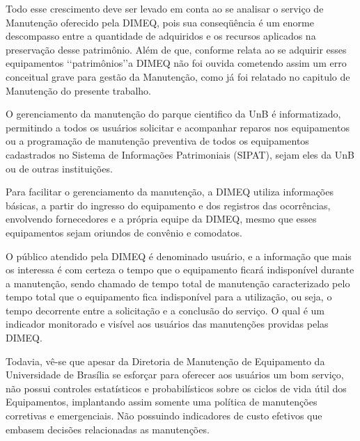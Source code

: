 Todo esse crescimento deve ser levado em conta ao se analisar o serviço de Manutenção oferecido pela DIMEQ, pois sua conseqüência é um enorme descompasso entre a quantidade de adquiridos e os recursos aplicados na preservação desse patrimônio. Além de que, conforme relata \cite{limacastilho2006} ao se adquirir esses equipamentos \lq\lq patrimônios\rq\rq a DIMEQ não foi ouvida cometendo assim um erro conceitual grave para gestão da Manutenção, como já foi relatado no capitulo de Manutenção do presente trabalho.
	
O gerenciamento da manutenção do parque cientifico da UnB é informatizado, permitindo a todos os usuários solicitar e acompanhar reparos nos equipamentos ou a programação de manutenção preventiva de todos os equipamentos cadastrados no Sistema de Informações Patrimoniais (SIPAT), sejam eles da UnB ou de outras instituições. 
	
Para facilitar o gerenciamento da manutenção, a DIMEQ utiliza informações básicas, a partir do ingresso do equipamento e dos registros das ocorrências, envolvendo fornecedores e a própria equipe da DIMEQ, mesmo que esses equipamentos sejam oriundos de convênio e comodatos.
	
O público atendido pela DIMEQ é denominado usuário, e a informação que mais os interessa é com certeza o tempo que o equipamento ficará indisponível durante a manutenção, sendo chamado de tempo total de manutenção caracterizado pelo tempo total que o equipamento fica indisponível para a utilização, ou seja, o tempo decorrente entre a solicitação e a conclusão do serviço. O qual é um indicador monitorado e visível aos usuários das manutenções providas pelas DIMEQ.

Todavia, vê-se que apesar da Diretoria de Manutenção de Equipamento da Universidade de Brasília se esforçar para oferecer aos usuários um bom serviço, não possui controles estatísticos e probabilísticos sobre os ciclos de vida útil dos Equipamentos, implantando assim somente uma política de manutenções corretivas e emergenciais. Não possuindo indicadores de custo efetivos que embasem decisões relacionadas as manutenções. 

